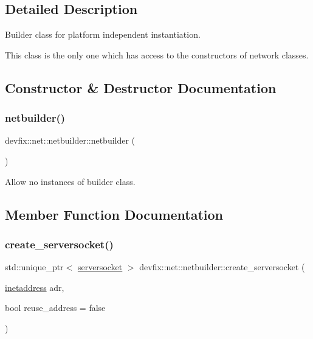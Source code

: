 \subsection{Detailed Description}
Builder class for platform independent instantiation. 

This class is the only one which has access to the constructors of network classes. 

\subsection{Constructor \& Destructor Documentation}
\mbox{\label{structdevfix_1_1net_1_1netbuilder_a36946dc1bd85a68d5c38aaf8533dd401}} 
\subsubsection{\texorpdfstring{netbuilder()}{netbuilder()}}
{\footnotesize\ttfamily devfix\+::net\+::netbuilder\+::netbuilder (\begin{DoxyParamCaption}{ }\end{DoxyParamCaption})\hspace{0.3cm}{\ttfamily [delete]}}



Allow no instances of builder class. 



\subsection{Member Function Documentation}
\mbox{\label{structdevfix_1_1net_1_1netbuilder_a9d685e1822c0be5d68fd6ba62876798b}} 
\subsubsection{\texorpdfstring{create\+\_\+serversocket()}{create\_serversocket()}}
{\footnotesize\ttfamily std\+::unique\+\_\+ptr$<$ \hyperlink{structdevfix_1_1net_1_1serversocket}{serversocket} $>$ devfix\+::net\+::netbuilder\+::create\+\_\+serversocket (\begin{DoxyParamCaption}\item[{\hyperlink{structdevfix_1_1net_1_1inetaddress}{inetaddress}}]{adr,  }\item[{bool}]{reuse\+\_\+address = {\ttfamily false} }\end{DoxyParamCaption})\hspace{0.3cm}{\ttfamily [static]}}



